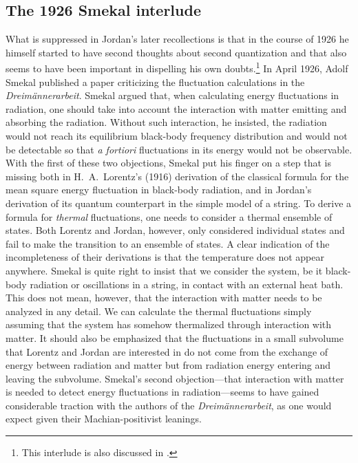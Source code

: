 \documentclass{elsart}
\begin{document}
\subsection{The 1926 Smekal interlude}

What is suppressed in Jordan's later recollections is that in the course of 1926 he himself started to have second thoughts about second quantization and that \citep{Dirac 1927} also seems to have been important in dispelling his own doubts.\footnote{This interlude is also discussed in \citep[pp.\ 222--225]{Darrigol 1986}.}  In April 1926, Adolf Smekal published a paper criticizing the fluctuation calculations in the {\it Dreim\"annerarbeit}. Smekal argued that, when calculating energy fluctuations in radiation, one should take into account the interaction with matter emitting and absorbing the radiation. Without such interaction, he insisted, the radiation would not reach its equilibrium black-body frequency distribution and would not be detectable so that {\it a fortiori} fluctuations in its energy would not be observable. With the first of these two objections, Smekal put his finger on a step that is missing both in H.\ A.\ Lorentz's (1916) derivation of the classical formula for the mean square energy fluctuation in black-body radiation, and in Jordan's derivation of its quantum counterpart in the simple model of a string. To derive a formula for {\it thermal} fluctuations, one needs to consider a thermal ensemble of states. Both Lorentz and Jordan, however, only considered individual states and fail to make the transition to an ensemble of states. A clear indication of the incompleteness of their derivations is that the temperature does not appear anywhere. Smekal is quite right to insist that we consider the system, be it black-body radiation or oscillations in a string, in contact with an external heat bath. This does not mean, however, that the interaction with matter needs to be analyzed in any detail.  We can calculate the thermal fluctuations simply assuming that the system has somehow thermalized through interaction with matter. It should also be emphasized that the fluctuations in a small subvolume that Lorentz and Jordan are interested in do not come from the exchange of energy between radiation and matter but from radiation energy entering and leaving the subvolume. Smekal's second objection---that interaction with matter is needed to detect energy fluctuations in radiation---seems to have gained considerable traction with the authors of the {\it Dreim\"annerarbeit}, as one would expect given their Machian-positivist leanings.
\end{document}

